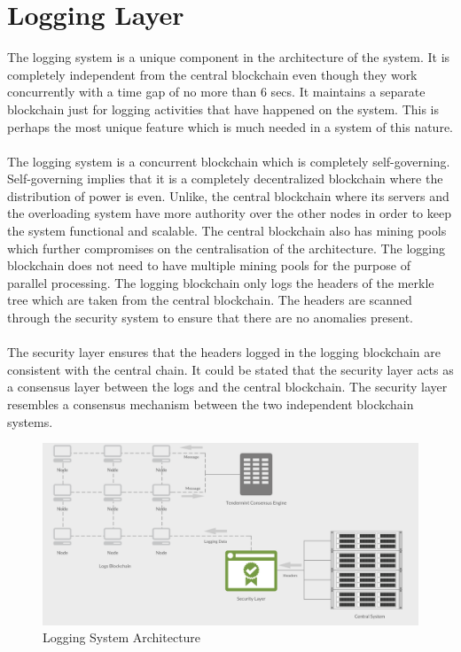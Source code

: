 \documentclass[a4paper,twoside,phd]{BYUPhys}
\begin{document}
\section{Logging Layer}
The logging system is a unique component in the architecture of the system. It is completely independent from the central blockchain even though they work concurrently with a time gap of no more than 6 secs. It maintains a separate blockchain just for logging activities that have happened on the system. This is perhaps the most unique feature which is much needed in a system of this nature.
\\
\\
The logging system is a concurrent blockchain which is completely self-governing. Self-governing implies that it is a completely decentralized blockchain where the distribution of power is even. Unlike, the central blockchain where its servers and the overloading system have more authority over the other nodes in order to keep the system functional and scalable. The central blockchain also has mining pools which further compromises on the centralisation of the architecture. The logging blockchain does not need to have multiple mining pools for the purpose of parallel processing. The logging blockchain only logs the headers of the merkle tree which are taken from the central blockchain. The headers are scanned through the security system to ensure that there are no anomalies present.\\
\\
The security layer ensures that the headers logged in the logging blockchain are consistent with the central chain. It could be stated that the security layer acts as a consensus layer between the logs and the central blockchain. The security layer resembles a consensus mechanism between the two independent blockchain systems.
\begin{figure}
  \includegraphics[width=\linewidth]{logging_layer.png}
  \caption{Logging System Architecture}
  \label{fig:2}
\end{figure}
\end{document}
